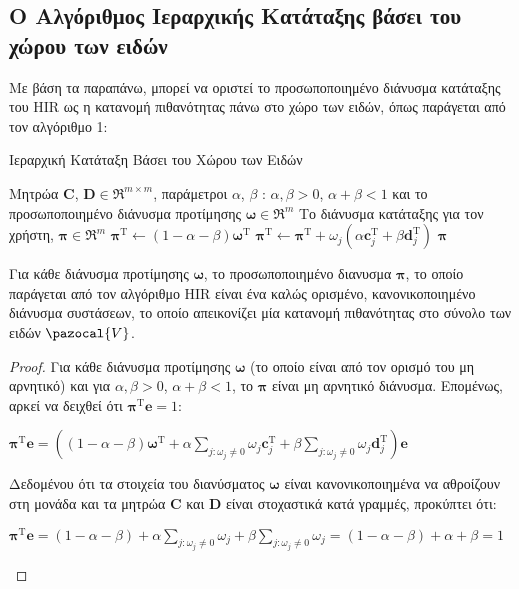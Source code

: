 \subsection{Ο Αλγόριθμος Ιεραρχικής Κατάταξης βάσει του χώρου των ειδών}
Με βάση τα παραπάνω, μπορεί να οριστεί το προσωποποιημένο διάνυσμα κατάταξης του {\en HIR} ως η κατανομή πιθανότητας πάνω στο χώρο των ειδών, όπως παράγεται από τον αλγόριθμο 1:
\begin{algorithm}[ht]
  \caption{Ιεραρχική Κατάταξη Βάσει του Χώρου των Ειδών}\label{}
  \begin{algorithmic}[1]
    \Require Μητρώα $\mathbf{C}$, $\mathbf{D} \in \Re^{m\times m}$, παράμετροι $\alpha$, $\beta$ : $\alpha, \beta > 0$, $\alpha + \beta < 1$ και το προσωποποιημένο διάνυσμα προτίμησης $\boldsymbol{\omega}\in \Re^m$
    \Ensure Το διάνυσμα κατάταξης για τον χρήστη, $\boldsymbol{\pi}\in \Re^m$
    \medskip
    \State $\boldsymbol{\pi}^\text{T} \gets (1-\alpha - \beta)\boldsymbol{\omega}^\text{T}$
      \State $\boldsymbol{\pi}^\text{T} \gets \boldsymbol{\pi}^\text{T} + \omega_j(\alpha\mathbf{c}_{j}^\text{T} + \beta\mathbf{d}_{j}^\text{T})$
    \EndFor
    \State \Return $ \boldsymbol{\pi} $
  \end{algorithmic}
\end{algorithm}
\begin{theorem}
Για κάθε διάνυσμα προτίμησης $\boldsymbol{\omega}$, το προσωποποιημένο διανυσμα $\boldsymbol{\pi}$, το οποίο παράγεται από τον αλγόριθμο \en HIR \el είναι ένα καλώς ορισμένο, κανονικοποιημένο διάνυσμα συστάσεων, το οποίο απεικονίζει μία κατανομή πιθανότητας στο σύνολο των ειδών $\pazocal{V}$.
\end{theorem}
\begin{proof}
Για κάθε διάνυσμα προτίμησης $\boldsymbol{\omega}$ (το οποίο είναι από τον ορισμό του μη αρνητικό) και για $\alpha, \beta > 0$, $\alpha+\beta<1$, το $\boldsymbol{\pi}$ είναι μη αρνητικό διάνυσμα. Επομένως, αρκεί να δειχθεί ότι $\boldsymbol{\pi}^{\text{T}}\mathbf{e} = 1$:
\begin{center}
$\boldsymbol{\pi}^{\text{T}}\mathbf{e} = ( (1 - \alpha - \beta) \boldsymbol{\omega}^{\text{T}} + \alpha \sum\limits_{j:{\omega}_j\neq 0} {\omega}_j\mathbf{c}_j^{\text{T}} + \beta \sum\limits_{j:{\omega}_j\neq 0} {\omega}_j\mathbf{d}_j^{\text{T}})\mathbf{e}$
\end{center}
Δεδομένου ότι τα στοιχεία του διανύσματος $\boldsymbol{\omega}$ είναι κανονικοποιημένα να αθροί\-ζουν στη μονάδα και τα μητρώα $\mathbf{C}$ και $\mathbf{D}$ είναι στοχαστικά κατά γραμμές, προκύπτει ότι: 
\begin{center}
$\boldsymbol{\pi}^{\text{T}}\mathbf{e} = (1 - \alpha -\beta) + 
\alpha \sum\limits_{j:{\omega}_j\neq 0}{\omega}_j + \beta \sum\limits_{j:{\omega}_j\neq 0} {\omega}_j = (1 - \alpha -\beta) + \alpha + \beta = 1 $
\end{center}
\end{proof}
